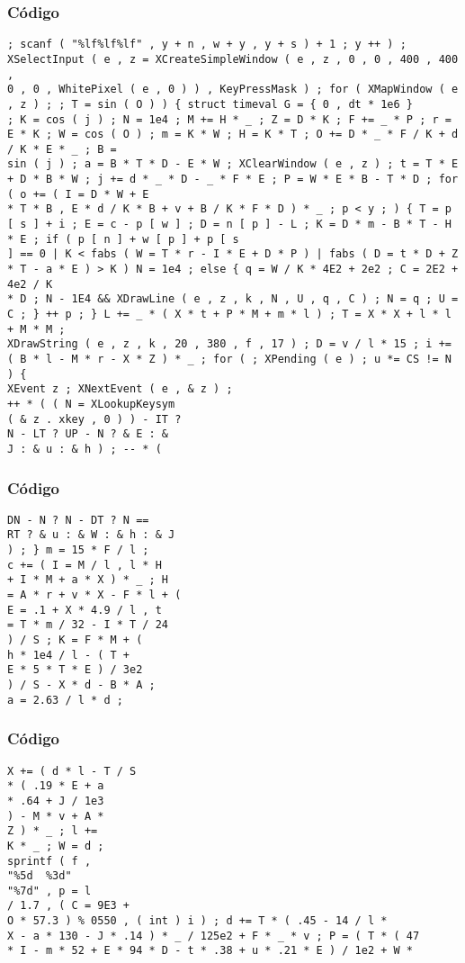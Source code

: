 \documentclass{beamer}
\begin{document}
\begin{frame}[fragile]
\frametitle{C\'odigo}
\begin{verbatim}
; scanf ( "%lf%lf%lf" , y + n , w + y , y + s ) + 1 ; y ++ ) ; XSelectInput ( e , z = XCreateSimpleWindow ( e , z , 0 , 0 , 400 , 400 , 
0 , 0 , WhitePixel ( e , 0 ) ) , KeyPressMask ) ; for ( XMapWindow ( e , z ) ; ; T = sin ( O ) ) { struct timeval G = { 0 , dt * 1e6 } 
; K = cos ( j ) ; N = 1e4 ; M += H * _ ; Z = D * K ; F += _ * P ; r = E * K ; W = cos ( O ) ; m = K * W ; H = K * T ; O += D * _ * F / K + d / K * E * _ ; B = 
sin ( j ) ; a = B * T * D - E * W ; XClearWindow ( e , z ) ; t = T * E + D * B * W ; j += d * _ * D - _ * F * E ; P = W * E * B - T * D ; for ( o += ( I = D * W + E 
* T * B , E * d / K * B + v + B / K * F * D ) * _ ; p < y ; ) { T = p [ s ] + i ; E = c - p [ w ] ; D = n [ p ] - L ; K = D * m - B * T - H * E ; if ( p [ n ] + w [ p ] + p [ s 
] == 0 | K < fabs ( W = T * r - I * E + D * P ) | fabs ( D = t * D + Z * T - a * E ) > K ) N = 1e4 ; else { q = W / K * 4E2 + 2e2 ; C = 2E2 + 4e2 / K 
* D ; N - 1E4 && XDrawLine ( e , z , k , N , U , q , C ) ; N = q ; U = C ; } ++ p ; } L += _ * ( X * t + P * M + m * l ) ; T = X * X + l * l + M * M ; 
XDrawString ( e , z , k , 20 , 380 , f , 17 ) ; D = v / l * 15 ; i += ( B * l - M * r - X * Z ) * _ ; for ( ; XPending ( e ) ; u *= CS != N ) { 
XEvent z ; XNextEvent ( e , & z ) ; 
++ * ( ( N = XLookupKeysym 
( & z . xkey , 0 ) ) - IT ? 
N - LT ? UP - N ? & E : & 
J : & u : & h ) ; -- * ( 
\end{verbatim}
\end{frame}
\begin{frame}[fragile]
\frametitle{C\'odigo}
\begin{verbatim}
DN - N ? N - DT ? N == 
RT ? & u : & W : & h : & J 
) ; } m = 15 * F / l ; 
c += ( I = M / l , l * H 
+ I * M + a * X ) * _ ; H 
= A * r + v * X - F * l + ( 
E = .1 + X * 4.9 / l , t 
= T * m / 32 - I * T / 24 
) / S ; K = F * M + ( 
h * 1e4 / l - ( T + 
E * 5 * T * E ) / 3e2 
) / S - X * d - B * A ; 
a = 2.63 / l * d ; 
\end{verbatim}
\end{frame}
\begin{frame}[fragile]
\frametitle{C\'odigo}
\begin{verbatim}
X += ( d * l - T / S 
* ( .19 * E + a 
* .64 + J / 1e3 
) - M * v + A * 
Z ) * _ ; l += 
K * _ ; W = d ; 
sprintf ( f , 
"%5d  %3d" 
"%7d" , p = l 
/ 1.7 , ( C = 9E3 + 
O * 57.3 ) % 0550 , ( int ) i ) ; d += T * ( .45 - 14 / l * 
X - a * 130 - J * .14 ) * _ / 125e2 + F * _ * v ; P = ( T * ( 47 
* I - m * 52 + E * 94 * D - t * .38 + u * .21 * E ) / 1e2 + W * 
\end{verbatim}
\end{frame}
\end{document}
